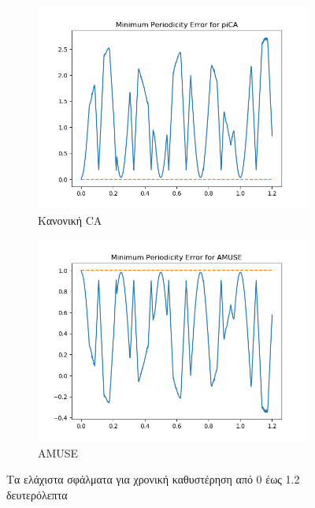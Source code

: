 \begin{figure}[H]
    \centering
    \begin{subfigure}{0.48 \textwidth}
        \centering
       \includegraphics[width=\textwidth]{fwto/piCA_Error_1.png}\en
        \caption{\gr Κανονική \en \pi CA} \gr
        \label{fig:5.6a}
    \end{subfigure}
    \hfill
    \begin{subfigure}{0.48 \textwidth}
        \centering
       \includegraphics[width=\textwidth]{fwto/Amuse_Error_1.png}
        \en
        \caption{AMUSE} \gr
        \label{fig:5.6b}
    \end{subfigure}
    \gr
    \caption{Τα ελάχιστα σφάλματα για χρονική καθυστέρηση από 0 έως 1.2 δευτερόλεπτα}
\end{figure}
